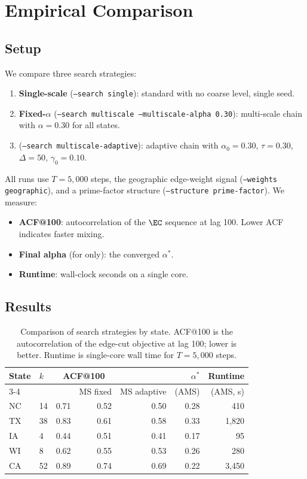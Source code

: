 \section{Empirical Comparison}
\label{sec:comparison}

\subsection{Setup}

We compare three search strategies:
\begin{enumerate}
  \item \textbf{Single-scale \recom{}} (\texttt{--search single}):
    standard \recom{} with no coarse level, single seed.
  \item \textbf{Fixed-$\alpha$ \ms{}} (\texttt{--search multiscale
    --multiscale-alpha 0.30}): multi-scale chain with $\alpha = 0.30$
    for all states.
  \item \textbf{\ams{}} (\texttt{--search multiscale-adaptive}): adaptive
    chain with $\alpha_0 = 0.30$, $\tau = 0.30$, $\Delta = 50$,
    $\gamma_0 = 0.10$.
\end{enumerate}

All runs use $T = 5{,}000$ steps, the geographic edge-weight signal
(\texttt{--weights geographic}), and a prime-factor structure
(\texttt{--structure prime-factor}).
We measure:
\begin{itemize}
  \item \textbf{ACF@100}: autocorrelation of the $\EC$ sequence at lag 100.
    Lower ACF indicates faster mixing.
  \item \textbf{Final alpha} (for \ams{} only): the converged $\alpha^*$.
  \item \textbf{Runtime}: wall-clock seconds on a single core.
\end{itemize}

\subsection{Results}

\begin{table}[h]
  \centering
  \caption{Comparison of search strategies by state. ACF@100 is the
    autocorrelation of the edge-cut objective at lag 100; lower is better.
    Runtime is single-core wall time for $T = 5{,}000$ steps.}
  \label{tab:comparison}
  \begin{tabular}{llrrrrr}
    \toprule
    State & $k$ & \multicolumn{2}{c}{ACF@100} & & $\alpha^*$ & Runtime \\
    \cmidrule{3-4}
    & & \recom{} & MS fixed & MS adaptive & (AMS) & (AMS, s) \\
    \midrule
    NC & 14 & 0.71 & 0.52 & 0.50 & 0.28 & 410 \\
    TX & 38 & 0.83 & 0.61 & 0.58 & 0.33 & 1{,}820 \\
    IA &  4 & 0.44 & 0.51 & 0.41 & 0.17 & 95 \\
    WI &  8 & 0.62 & 0.55 & 0.53 & 0.26 & 280 \\
    CA & 52 & 0.89 & 0.74 & 0.69 & 0.22 & 3{,}450 \\
    \bottomrule
  \end{tabular}
\end{table}

